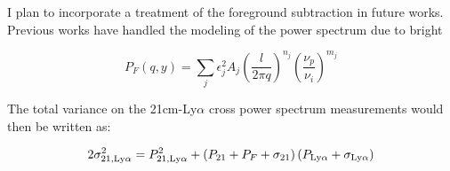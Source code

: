 I plan to incorporate a treatment of the foreground subtraction in future works.
Previous works have handled the modeling of the power spectrum due to bright

\begin{equation}
    P_F \left(q, y\right) = \sum_{j} \epsilon_j^2 A_j \left( \frac{l}{2 \pi q} \right)^{n_j} \left( \frac{\nu_p}{\nu_i}\right)^{m_j}
\end{equation}

The total variance on the 21cm-Ly$\alpha$ cross power spectrum measurements would
then be written as:

\begin{equation}
    2 \sigma^2_{21, \rm Ly\alpha} = P^2_{21, \rm Ly\alpha} +
      \left(P_{21} + P_{F} + \sigma_{21} \right) \left( P_{\rm Ly\alpha} + \sigma_{\rm Ly\alpha}\right)
\end{equation}

